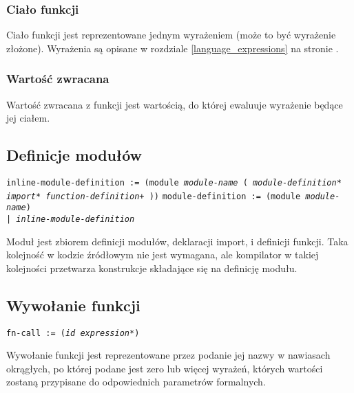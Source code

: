 \subsubsection{Ciało funkcji}

Ciało funkcji jest reprezentowane jednym wyrażeniem (może to być wyrażenie złożone).
Wyrażenia są opisane w rozdziale
\ref{language_expressions} na stronie \pageref{language_expressions}.

\subsubsection{Wartość zwracana}

Wartość zwracana z funkcji jest wartością, do której ewaluuje wyrażenie będące jej ciałem.

\subsection{Definicje modułów}
\label{viuact_spec_module_definition}

\texttt{inline-module-definition := (module \emph{module-name} (
\newline
\phantom{inline-module-definition := ~ }\emph{module-definition}*
\newline
\phantom{inline-module-definition := ~ }\emph{import}*
\newline
\phantom{inline-module-definition := ~ }\emph{function-definition}+
))}
\newline
\texttt{module-definition := (module \emph{module-name}) \\
\phantom{module-definition :}| \emph{inline-module-definition}}
\newline

Moduł jest zbiorem definicji modułów, deklaracji import, i definicji funkcji.
Taka kolejność w kodzie źródłowym nie jest wymagana, ale kompilator w takiej kolejności przetwarza konstrukcje
składające się na definicję modułu.

\subsection{Wywołanie funkcji}
\label{viuact_spec_fn_call}

\texttt{fn-call := (\emph{id} \emph{expression}*)}
\newline

Wywołanie funkcji jest reprezentowane przez podanie jej nazwy w nawiasach okrągłych, po której podane jest
zero lub więcej wyrażeń, których wartości zostaną przypisane do odpowiednich parametrów formalnych.

